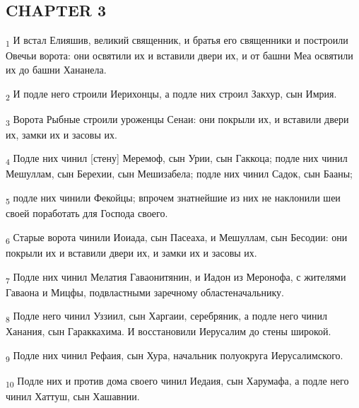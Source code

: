 \subsection{CHAPTER 3}
\begin{tcolorbox}
\textsubscript{1} И встал Елияшив, великий священник, и братья его священники и построили Овечьи ворота: они освятили их и вставили двери их, и от башни Меа освятили их до башни Хананела.
\end{tcolorbox}
\begin{tcolorbox}
\textsubscript{2} И подле него строили Иерихонцы, а подле них строил Закхур, сын Имрия.
\end{tcolorbox}
\begin{tcolorbox}
\textsubscript{3} Ворота Рыбные строили уроженцы Сенаи: они покрыли их, и вставили двери их, замки их и засовы их.
\end{tcolorbox}
\begin{tcolorbox}
\textsubscript{4} Подле них чинил [стену] Меремоф, сын Урии, сын Гаккоца; подле них чинил Мешуллам, сын Берехии, сын Мешизабела; подле них чинил Садок, сын Бааны;
\end{tcolorbox}
\begin{tcolorbox}
\textsubscript{5} подле них чинили Фекойцы; впрочем знатнейшие из них не наклонили шеи своей поработать для Господа своего.
\end{tcolorbox}
\begin{tcolorbox}
\textsubscript{6} Старые ворота чинили Иоиада, сын Пасеаха, и Мешуллам, сын Бесодии: они покрыли их и вставили двери их, и замки их и засовы их.
\end{tcolorbox}
\begin{tcolorbox}
\textsubscript{7} Подле них чинил Мелатия Гаваонитянин, и Иадон из Меронофа, с жителями Гаваона и Мицфы, подвластными заречному областеначальнику.
\end{tcolorbox}
\begin{tcolorbox}
\textsubscript{8} Подле него чинил Уззиил, сын Харгаии, серебряник, а подле него чинил Ханания, сын Гараккахима. И восстановили Иерусалим до стены широкой.
\end{tcolorbox}
\begin{tcolorbox}
\textsubscript{9} Подле них чинил Рефаия, сын Хура, начальник полуокруга Иерусалимского.
\end{tcolorbox}
\begin{tcolorbox}
\textsubscript{10} Подле них и против дома своего чинил Иедаия, сын Харумафа, а подле него чинил Хаттуш, сын Хашавнии.
\end{tcolorbox}
